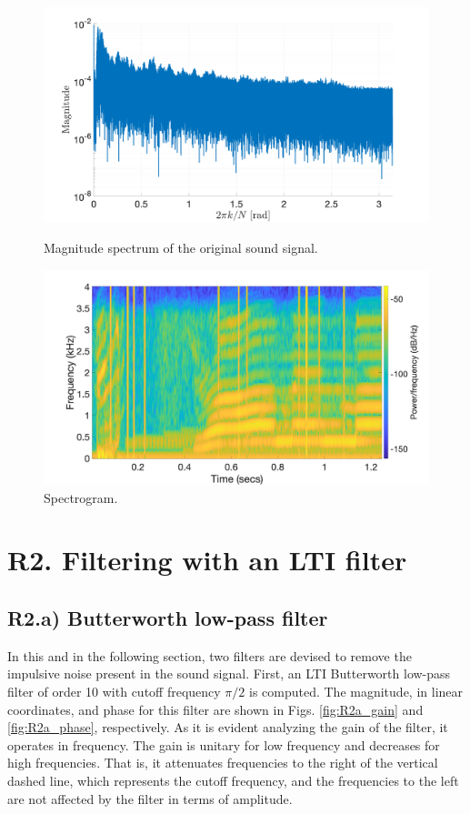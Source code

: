 \documentclass[]{scrartcl}
\begin{document}
\begin{figure}[htbp]
	\centering
	\begin{minipage}[b]{.49\textwidth}
		\centering
		\includegraphics[width= 1.1\textwidth]{figures/R1c.png}
		\caption{Magnitude spectrum of the original sound signal.}
		\label{fig:R1c}
	\end{minipage}
	\hfill
	\begin{minipage}[b]{.49\textwidth}
		\centering
		\includegraphics[width= 1.1\textwidth]{figures/R1c_spectrogram.png}
		\caption{Spectrogram.}
		\label{fig:R1c_spectrogram}
	\end{minipage}
\end{figure}

\section{R2. Filtering with an LTI filter}
\subsection{R2.a) Butterworth low-pass filter}
In this and in the following section, two filters are devised to remove the impulsive noise present in the sound signal. First, an LTI Butterworth low-pass filter of order 10 with cutoff frequency $\pi/2$ is computed. The magnitude, in linear coordinates, and phase for this filter are shown in Figs. \ref{fig:R2a_gain} and \ref{fig:R2a_phase}, respectively. As it is evident analyzing the gain of the filter, it operates in frequency. The gain is unitary for low frequency and decreases for high frequencies. That is, it attenuates frequencies to the right of the vertical dashed line, which represents the cutoff frequency, and the frequencies to the left are not affected by the filter in terms of amplitude.
\end{document}

